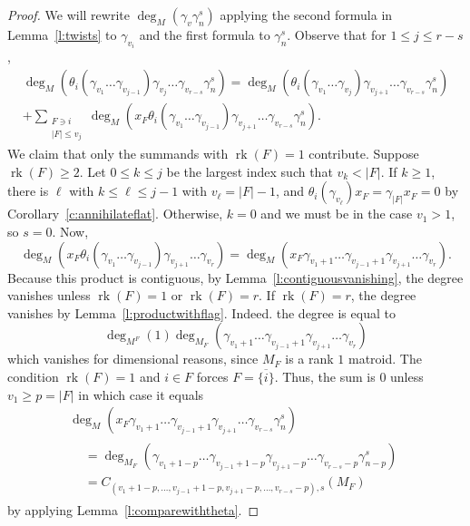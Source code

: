 \documentclass[ALCO,published]{cedram}
\numberwithin{equation}{section}
\numberwithin{figure}{section}
\DeclareMathOperator{\rk}{rk}
\begin{document}
\begin{proof}
    We will rewrite $\deg_M(\gamma_v\gamma_n^s)$ applying the second formula in Lemma~\ref{l:twists} to $\gamma_{v_i}$ and the first formula to $\gamma_n^s$. 
    Observe that for $1\leq j\leq r-s$,
    \begin{multline*} 
    \deg_M(\theta_i(\gamma_{v_1}\dots\gamma_{v_{j-1}})\gamma_{v_j}\dots\gamma_{v_{r-s}}\gamma_n^s)=    \deg_M(\theta_i(\gamma_{v_1}\dots\gamma_{v_j})\gamma_{v_{j+1}}\dots\gamma_{v_{r-s}}\gamma_n^s)\\
    +\sum_{\substack{F\ni i\\|F|\leq v_j}} \deg_M(x_F \theta_i(\gamma_{v_1}\dots\gamma_{v_{j-1}})\gamma_{v_{j+1}}\dots\gamma_{v_{r-s}}\gamma_n^s).
    \end{multline*}
    We claim that only the summands with $\rk(F)=1$ contribute. Suppose $\rk(F)\geq 2$. 
    Let $0\leq k\leq j$ be the largest index such that $v_{k}<|F|$. If $k\geq 1$, there is $\ell$ with $k\leq\ell\leq j-1$ with $v_{\ell}=|F|-1$, and $\theta_i(\gamma_{v_\ell})x_F=\gamma_{|F|}x_F=0$ by Corollary~\ref{c:annihilateflat}. Otherwise, $k=0$ and we must be in the case $v_1>1$, so $s=0$. Now,
    \[\deg_M(x_F \theta_i(\gamma_{v_1}\dots\gamma_{v_{j-1}})\gamma_{v_{j+1}}\dots\gamma_{v_r})=
    \deg_M(x_F \gamma_{{v_1}+1}\dots\gamma_{v_{j-1}+1}\gamma_{v_{j+1}}\dots\gamma_{v_r}).
    \]
    Because this product is contiguous, by Lemma~\ref{l:contiguousvanishing}, the degree vanishes unless $\rk(F)=1$ or $\rk(F)=r$. If $\rk(F)=r$, the degree vanishes by Lemma~\ref{l:productwithflag}. Indeed. the degree is equal to 
    \[\deg_{M^F}(1)\deg_{M_F}(\gamma_{v_1+1}\dots\gamma_{v_{j-1}+1}\gamma_{v_{j+1}}\dots\gamma_{v_r})\]
    which vanishes for dimensional reasons, since $M_F$ is a rank $1$ matroid.
    The condition $\rk(F)=1$ and $i\in F$ forces $F=\overline{\{i\}}$. Thus, the sum is $0$ unless $v_1\geq p=|F|$ in which case it equals
    \begin{multline*}
    \deg_M(x_F \gamma_{v_1+1}\dots\gamma_{v_{j-1}+1}\gamma_{v_{j+1}}\dots\gamma_{v_{r-s}}\gamma_n^s)\\
    \begin{aligned}
    &  = \deg_{M_F}(\gamma_{v_1+1-p}\dots\gamma_{v_{j-1}+1-p}\gamma_{v_{j+1}-p}\dots\gamma_{v_{r-s}-p}\gamma_{n-p}^s)\\
    & = C_{(v_1+1-p,\dots,v_{j-1}+1-p,v_{j+1}-p,\dots,v_{r-s}-p),s}(M_F)
    \end{aligned}
    \end{multline*}
    by applying Lemma~\ref{l:comparewiththeta}.

\end{proof}
\end{document}
